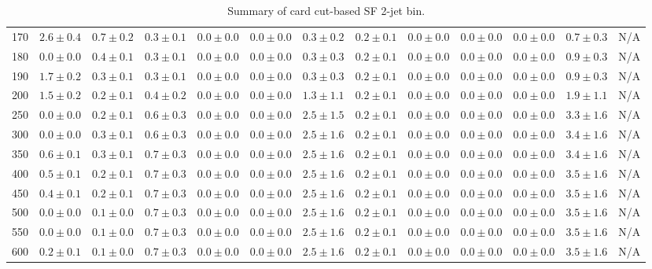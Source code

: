 \begin{table}
{\begin{center}
\begin{tabular}{l | c c | c c c c c c c c  | c c}
170 & $2.6\pm0.4$ & $0.7\pm0.2$ & $0.3\pm0.1$ & $0.0\pm0.0$ & $0.0\pm0.0$ & $0.3\pm0.2$ & $0.2\pm0.1$ & $0.0\pm0.0$ & $0.0\pm0.0$ & $0.0\pm0.0$ & $0.7\pm0.3$ & N/A \\
180 & $0.0\pm0.0$ & $0.4\pm0.1$ & $0.3\pm0.1$ & $0.0\pm0.0$ & $0.0\pm0.0$ & $0.3\pm0.3$ & $0.2\pm0.1$ & $0.0\pm0.0$ & $0.0\pm0.0$ & $0.0\pm0.0$ & $0.9\pm0.3$ & N/A \\
190 & $1.7\pm0.2$ & $0.3\pm0.1$ & $0.3\pm0.1$ & $0.0\pm0.0$ & $0.0\pm0.0$ & $0.3\pm0.3$ & $0.2\pm0.1$ & $0.0\pm0.0$ & $0.0\pm0.0$ & $0.0\pm0.0$ & $0.9\pm0.3$ & N/A \\
200 & $1.5\pm0.2$ & $0.2\pm0.1$ & $0.4\pm0.2$ & $0.0\pm0.0$ & $0.0\pm0.0$ & $1.3\pm1.1$ & $0.2\pm0.1$ & $0.0\pm0.0$ & $0.0\pm0.0$ & $0.0\pm0.0$ & $1.9\pm1.1$ & N/A \\
250 & $0.0\pm0.0$ & $0.2\pm0.1$ & $0.6\pm0.3$ & $0.0\pm0.0$ & $0.0\pm0.0$ & $2.5\pm1.5$ & $0.2\pm0.1$ & $0.0\pm0.0$ & $0.0\pm0.0$ & $0.0\pm0.0$ & $3.3\pm1.6$ & N/A \\
300 & $0.0\pm0.0$ & $0.3\pm0.1$ & $0.6\pm0.3$ & $0.0\pm0.0$ & $0.0\pm0.0$ & $2.5\pm1.6$ & $0.2\pm0.1$ & $0.0\pm0.0$ & $0.0\pm0.0$ & $0.0\pm0.0$ & $3.4\pm1.6$ & N/A \\
350 & $0.6\pm0.1$ & $0.3\pm0.1$ & $0.7\pm0.3$ & $0.0\pm0.0$ & $0.0\pm0.0$ & $2.5\pm1.6$ & $0.2\pm0.1$ & $0.0\pm0.0$ & $0.0\pm0.0$ & $0.0\pm0.0$ & $3.4\pm1.6$ & N/A \\
400 & $0.5\pm0.1$ & $0.2\pm0.1$ & $0.7\pm0.3$ & $0.0\pm0.0$ & $0.0\pm0.0$ & $2.5\pm1.6$ & $0.2\pm0.1$ & $0.0\pm0.0$ & $0.0\pm0.0$ & $0.0\pm0.0$ & $3.5\pm1.6$ & N/A \\
450 & $0.4\pm0.1$ & $0.2\pm0.1$ & $0.7\pm0.3$ & $0.0\pm0.0$ & $0.0\pm0.0$ & $2.5\pm1.6$ & $0.2\pm0.1$ & $0.0\pm0.0$ & $0.0\pm0.0$ & $0.0\pm0.0$ & $3.5\pm1.6$ & N/A \\
500 & $0.0\pm0.0$ & $0.1\pm0.0$ & $0.7\pm0.3$ & $0.0\pm0.0$ & $0.0\pm0.0$ & $2.5\pm1.6$ & $0.2\pm0.1$ & $0.0\pm0.0$ & $0.0\pm0.0$ & $0.0\pm0.0$ & $3.5\pm1.6$ & N/A \\
550 & $0.0\pm0.0$ & $0.1\pm0.0$ & $0.7\pm0.3$ & $0.0\pm0.0$ & $0.0\pm0.0$ & $2.5\pm1.6$ & $0.2\pm0.1$ & $0.0\pm0.0$ & $0.0\pm0.0$ & $0.0\pm0.0$ & $3.5\pm1.6$ & N/A \\
600 & $0.2\pm0.1$ & $0.1\pm0.0$ & $0.7\pm0.3$ & $0.0\pm0.0$ & $0.0\pm0.0$ & $2.5\pm1.6$ & $0.2\pm0.1$ & $0.0\pm0.0$ & $0.0\pm0.0$ & $0.0\pm0.0$ & $3.5\pm1.6$ & N/A \\
\hline
\end{tabular}
\end{center}
}
\caption{Summary of card cut-based SF 2-jet bin.}
\end{table}

